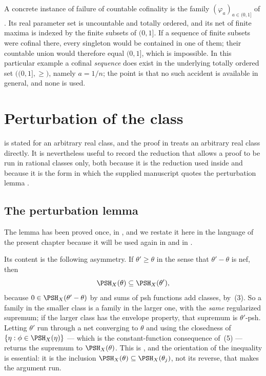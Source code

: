 A concrete instance of failure of countable cofinality is the family
$(\varphi_a)_{a\in(0,1]}$ of
.  Its real parameter set is uncountable
and totally ordered, and its net of finite maxima is indexed by the finite subsets of
$(0,1]$.  If a sequence of finite subsets were cofinal there, every
singleton would be contained in one of them; their countable union would
therefore equal $(0,1]$, which is impossible.  In this particular example a
cofinal
\emph{sequence} does exist in the underlying totally ordered set
$\bigl((0,1],\ge\bigr)$, namely $a=1/n$; the point is that no such
accident is available in general, and none is used.

\section{Perturbation of the class}
\label{sec:ch45-perturbation}

 is stated for an arbitrary real class, and the
proof in  treats an arbitrary real class directly.  It
is nevertheless useful to record the reduction that allows a proof to be run
in rational classes only, both because it is the reduction used inside
 and because it is the form in which the
supplied manuscript quotes the perturbation lemma
\cite[Lemma~5.9]{BJ22}.

\subsection{The perturbation lemma}
\label{sec:ch45-perturbation-lemma}

The lemma has been proved once, in , and
we restate it here in the language of the present chapter because it will be
used again in  and in
.

Its content is the following asymmetry.  If $\theta'\ge\theta$ in the
sense that $\theta'-\theta$ is nef, then
\[
 \PSH_X(\theta)\subseteq\PSH_X(\theta'),
\]
because $0\in\PSH_X(\theta'-\theta)$ by  and
sums of psh functions add classes, by \,(3).  So
a family in the smaller class is a family in the larger one, with the
\emph{same} regularized supremum; if the larger class has the envelope
property, that supremum is $\theta'$-psh.  Letting $\theta'$ run through
a net converging to $\theta$ and using the closedness of
$\{\eta:\phi\in\PSH_X(\eta)\}$ --- which is the constant-function consequence of
\,(5) --- returns the supremum to
$\PSH_X(\theta)$.  This is , and the
orientation of the inequality is essential: it is the inclusion
$\PSH_X(\theta)\subseteq\PSH_X(\theta_j)$, not its reverse, that makes the
argument run.

